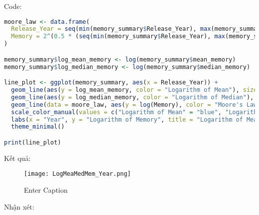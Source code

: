 Code:
\begin{lstlisting}[language=R]
moore_law <- data.frame(
  Release_Year = seq(min(memory_summary$Release_Year), max(memory_summary$Release_Year), 1),
  Memory = 2^(0.5 * (seq(min(memory_summary$Release_Year), max(memory_summary$Release_Year), 1) - min(memory_summary$Release_Year - 8)))
)

memory_summary$log_mean_memory <- log(memory_summary$mean_memory)
memory_summary$log_median_memory <- log(memory_summary$median_memory)

line_plot <- ggplot(memory_summary, aes(x = Release_Year)) +
  geom_line(aes(y = log_mean_memory, color = "Logarithm of Mean"), size = 1) +
  geom_line(aes(y = log_median_memory, color = "Logarithm of Median"), size = 1) +
  geom_line(data = moore_law, aes(y = log(Memory), color = "Moore's Law"), size = 1, linetype = "dashed") +
  scale_color_manual(values = c("Logarithm of Mean" = "blue", "Logarithm of Median" = "red", "Moore's Law" = "green4")) +
  labs(x = "Year", y = "Logarithm of Memory", title = "Logarithm of Mean and Median Memory by Year") +
  theme_minimal()

print(line_plot)
\end{lstlisting}
Kết quả:

\begin{figure}[h]
  \centering
  \texttt{[image: LogMeaMedMem\_Year.png]}
  \vspace{1pt}
  \caption{Enter Caption}
  \label{fig:enter-label}
\end{figure}

Nhận xét:


